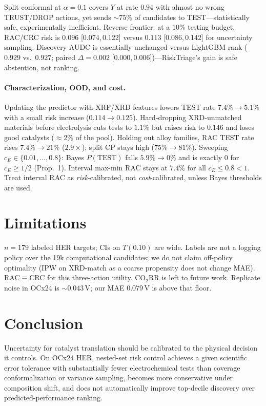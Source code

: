 \documentclass[10pt,twocolumn]{article}
\newcommand{\cE}{c_{E}}
\begin{document}
Split conformal at $\alpha{=}0.1$ covers $Y$ at rate $0.94$ with almost no wrong TRUST/DROP actions, yet sends ${\sim}75\%$ of candidates to TEST---statistically safe, experimentally inefficient. Reverse frontier: at a 10\% testing budget, RAC/CRC risk is $0.096$ {[0.074,\,0.122]} versus $0.113$ {[0.086,\,0.142]} for uncertainty sampling. Discovery AUDC is essentially unchanged versus LightGBM rank ($0.929$ vs.\ $0.927$; paired $\Delta{=}0.002$ {[0.000,\,0.006]})---RiskTriage's gain is safe abstention, not ranking.

\paragraph{Characterization, OOD, and cost.}
Updating the predictor with XRF/XRD features lowers TEST rate $7.4\%\to 5.1\%$ with a small risk increase ($0.114\to 0.125$). Hard-dropping XRD-unmatched materials before electrolysis cuts tests to $1.1\%$ but raises risk to $0.146$ and loses good catalysts (${\approx}2\%$ of the pool). Holding out alloy families, RAC TEST rate rises $7.4\%\to 21\%$ ($2.9\times$); split CP stays high ($75\%\to 81\%$). Sweeping $\cE\in\{0.01,\ldots,0.8\}$: Bayes $P(\mathrm{TEST})$ falls $5.9\%\to 0\%$ and is exactly $0$ for $\cE\ge 1/2$ (Prop.~1). Interval max-min RAC stays at $7.4\%$ for all $\cE\le 0.8<1$. Treat interval RAC as \emph{risk}-calibrated, not \emph{cost}-calibrated, unless Bayes thresholds are used.

\vspace{-0.4em}
\section{Limitations}
\vspace{-0.3em}
\(n{=}179\) labeled HER targets; CIs on \(T(0.10)\) are wide. Labels are not a logging policy over the 19k computational candidates; we do not claim off-policy optimality (IPW on XRD-match as a coarse propensity does not change MAE). RAC\(\equiv\)CRC for this three-action utility. CO\(_2\)RR is left to future work. Replicate noise in OCx24 is \({\sim}0.043\,\mathrm{V}\); our MAE \(0.079\,\mathrm{V}\) is above that floor.

\vspace{-0.4em}
\section{Conclusion}
\vspace{-0.3em}
Uncertainty for catalyst translation should be calibrated to the physical decision it controls. On OCx24 HER, nested-set risk control achieves a given scientific error tolerance with substantially fewer electrochemical tests than coverage conformalization or variance sampling, becomes more conservative under composition shift, and does not automatically improve top-decile discovery over predicted-performance ranking.
\end{document}
